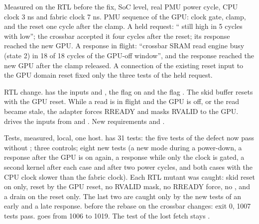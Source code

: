 \begin{record}

Measured on the RTL before the fix, SoC level, real PMU power cycle, CPU clock 3 ns and fabric clock 7 ns. PMU sequence of the GPU: clock gate, clamp, and the reset one cycle after the clamp. A held request: `` still high in 5 cycles with  low''; the crossbar accepted it four cycles after the reset; its response reached the new GPU. A response in flight: ``crossbar SRAM read engine busy (state 2) in 18 of 18 cycles of the GPU-off window'', and the response reached the new GPU after the clamp released. A connection of the existing reset input to the GPU domain reset fixed only the three tests of the held request.

\end{record}

\begin{record}

RTL change.  has the inputs  and , the flag  on  and the flag . The skid buffer resets with the GPU reset. While a read is in flight and the GPU is off, or the read became stale, the adapter forces RREADY and masks RVALID to the GPU.  drives the inputs from  and . New requirements  and .

\end{record}

\begin{record}

Tests, measured, local, one host.  has 31 tests: the five tests of the defect now pass without ; three controls; eight new tests (a new mode during a power-down, a response after the GPU is on again, a response while only the clock is gated, a second kernel after each case and after two power cycles, and both cases with the CPU clock slower than the fabric clock). Each RTL mutant was caught: skid reset on  only,  reset by the GPU reset, no RVALID mask, no RREADY force, no , and a drain on the reset only. The last two are caught only by the new tests of an early and a late response.  before the rebase on the crossbar changes: exit 0, 1007 tests pass.  goes from 1006 to 1019. The test of the lost fetch stays .

\end{record}

